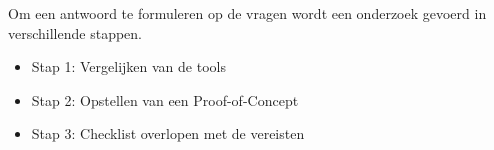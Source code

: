 Om een antwoord te formuleren op de vragen wordt een onderzoek gevoerd in verschillende stappen.

\begin{itemize}
    \item Stap 1: Vergelijken van de tools
    \item Stap 2: Opstellen van een Proof-of-Concept
    \item Stap 3: Checklist overlopen met de vereisten
\end{itemize}






